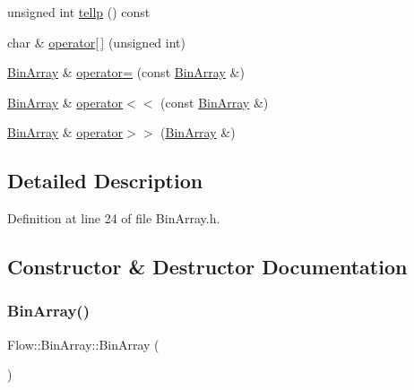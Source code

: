 \begin{DoxyCompactItemize}
\item 
unsigned int \hyperlink{class_flow_1_1_bin_array_a3ca3149690c2c047feb34a68a96e85ab}{tellp} () const
\item 
char \& \hyperlink{class_flow_1_1_bin_array_a87515820c4ed919c887f3e2bfafd4778}{operator\mbox{[}$\,$\mbox{]}} (unsigned int)
\item 
\hyperlink{class_flow_1_1_bin_array}{Bin\+Array} \& \hyperlink{class_flow_1_1_bin_array_a4c4c52bb282f728626b26ea3a1c3dbf2}{operator=} (const \hyperlink{class_flow_1_1_bin_array}{Bin\+Array} \&)
\item 
\hyperlink{class_flow_1_1_bin_array}{Bin\+Array} \& \hyperlink{class_flow_1_1_bin_array_ae96cbeda3525a0573a4714d6f92cca08}{operator$<$$<$} (const \hyperlink{class_flow_1_1_bin_array}{Bin\+Array} \&)
\item 
\hyperlink{class_flow_1_1_bin_array}{Bin\+Array} \& \hyperlink{class_flow_1_1_bin_array_a76be94c7c5f986d7ee31cd781c867d45}{operator$>$$>$} (\hyperlink{class_flow_1_1_bin_array}{Bin\+Array} \&)
\end{DoxyCompactItemize}


\subsection{Detailed Description}


Definition at line 24 of file Bin\+Array.\+h.



\subsection{Constructor \& Destructor Documentation}
\hypertarget{class_flow_1_1_bin_array_a7a0c55743a9f13a879fadf436975c783}{}\label{class_flow_1_1_bin_array_a7a0c55743a9f13a879fadf436975c783} 
\subsubsection{\texorpdfstring{Bin\+Array()}{BinArray()}\hspace{0.1cm}{\footnotesize\ttfamily [1/4]}}
{\footnotesize\ttfamily Flow\+::\+Bin\+Array\+::\+Bin\+Array (\begin{DoxyParamCaption}{ }\end{DoxyParamCaption})}




